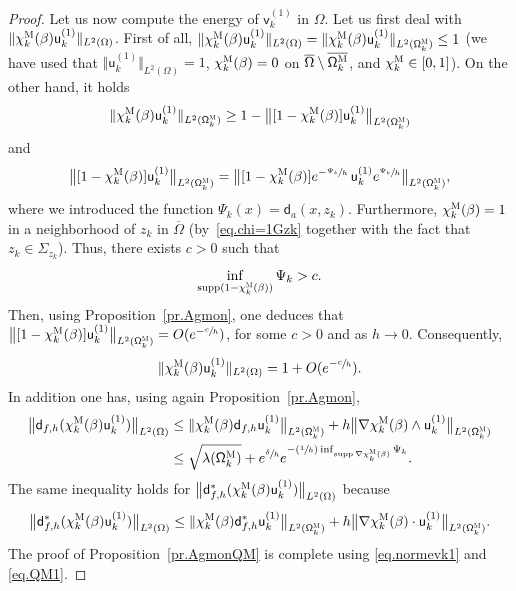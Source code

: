 \documentclass[JEP,XML,SOM,Unicode,NoEqCountersInSection,NoFloatCountersInSection,published]{cedram}
\newcommand{\Psfrac}[2]{(\sfrac{#1}{#2})}
\DeclareMathOperator\supp{supp}
\theoremstyle{plain}
\theoremstyle{definition}
\begin{document}
\begin{proof}
Let us now compute the energy of $\mathsf v_k^{(1)}$ in $\Omega$.
Let us first deal with $\Vert \chi_k^{\textsc{M}} (\beta)\mathsf u_k^{(1)}\Vert _{ L^2 (\Omega) }$. First of all, $\Vert \chi_k^{\textsc{M}} (\beta)\mathsf u_k^{(1)}\Vert _{ L^2 (\Omega) }=\Vert \chi_k^{\textsc{M}} (\beta)\mathsf u_k^{(1)}\Vert _{ L^2 (\mathsf \Omega^{\textsc{M}}_k) }\le 1$ (we have used that $\Vert \mathsf u_k^{(1)}\Vert _{ L^2 (\Omega) }= 1$, $\chi_k^{\textsc{M}} (\beta)=0$ on $\overline{\Omega}\setminus \overline{ \mathsf \Omega_k^{\textsc{M}}}$, and $\chi_k^{\textsc{M}}\in [0,1]$).
On the other hand, it holds
\[
\Vert \chi_k^{\textsc{M}} (\beta)\mathsf u_k^{(1)}\Vert _{ L^2 (\mathsf \Omega_k^{\textsc{M}}) } \ge 1- \big \Vert [1-\chi_k^{\textsc{M}} (\beta)]\mathsf u_k^{(1)}\big \Vert _{ L^2 (\mathsf \Omega_k^{\textsc{M}}) }
\]
and
\[
\big \Vert [1-\chi_k^{\textsc{M}} (\beta)]\mathsf u_k^{(1)}\big
\Vert _{ L^2 (\mathsf \Omega_k^{\textsc{M}}) } = \big \Vert
[1-\chi_k^{\textsc{M}} (\beta)]e^{-\sfrac{\Psi_k}{h}}\, \mathsf
u_k^{(1)}e^{\sfrac{\Psi_k}{h}}\big \Vert _{ L^2 (\mathsf
\Omega_k^{\textsc{M}}) },
\]
where we introduced the function $\Psi_k(x)=\mathsf d_a(x,z_k)$.
Furthermore, $\chi_k^{\textsc{M}} (\beta)=1$ in a neighborhood of $z_k$ in $\overline \Omega$ (by~\eqref{eq.chi=1Gzk} together with the fact that $z_k\in \Sigma_{z_k}$). Thus, there exists $c>0$ such that
\[
\inf_{\text{supp}(1-\chi_k^{\textsc{M}} (\beta))} \Psi_k>c.
\]
Then, using Proposition~\ref{pr.Agmon}, one deduces that $\big \Vert [1-\chi_k^{\textsc{M}} (\beta)]\mathsf u_k^{(1)}\big \Vert _{ L^2 (\mathsf \Omega_k^{\textsc{M}}) }=O(e^{-\sfrac ch})$, for some $c>0$ and as $h\to 0$. Consequently,
\begin{align}\label{eq.normevk1}
\Vert \chi_k^{\textsc{M}} (\beta)\mathsf u_k^{(1)}\Vert _{ L^2 (\Omega) }=1+O(e^{-\sfrac ch}).
\end{align}
In addition one has, using again Proposition~\ref{pr.Agmon},
\begin{align*}
\big \| \mathsf d_{f,h} (\chi_k^{\textsc{M}} (\beta)\mathsf u_k^{(1)}) \big \|_{ L^{2} (\Omega)}&\le \| \chi_k^{\textsc{M}} (\beta) \mathsf d_{f,h} \mathsf u_k^{(1)} \big \|_{ L^{2} (\mathsf \Omega_k^{\textsc{M}})} + h \big \| \nabla \chi_k^{\textsc{M}} (\beta)\wedge \mathsf u_k^{(1)} \big \|_{ L^{2} (\mathsf \Omega_k^{\textsc{M}})}\\
&\le \sqrt {\lambda(\mathsf \Omega_k^{\textsc{M}})}+ e^{\sfrac \delta h} e^{-\Psfrac 1h \inf_{\supp \nabla \chi_k^{\textsc{M}} (\beta)} \Psi_k}.
\end{align*}
The same inequality holds for $\big \| \mathsf d^*_{f,h} (\chi_k^{\textsc{M}} (\beta)\mathsf u_k^{(1)}) \big \|_{ L^{2} (\Omega)}$ because
\[
\big \| \mathsf d^*_{f,h} (\chi_k^{\textsc{M}} (\beta)\mathsf u_k^{(1)}) \big \|_{ L^{2} (\Omega)}\le \| \chi_k^{\textsc{M}} (\beta) \mathsf d^*_{f,h} \mathsf u_k^{(1)} \big \|_{ L^{2} (\mathsf \Omega_k^{\textsc{M}})} + h \big \| \nabla \chi_k^{\textsc{M}} (\beta)\cdot\mathsf u_k^{(1)} \big \|_{ L^{2} (\mathsf \Omega_k^{\textsc{M}})}.
\]
The proof of Proposition~\ref{pr.AgmonQM} is complete using \eqref{eq.normevk1} and \eqref{eq.QM1}.
\end{proof}
\end{document}
